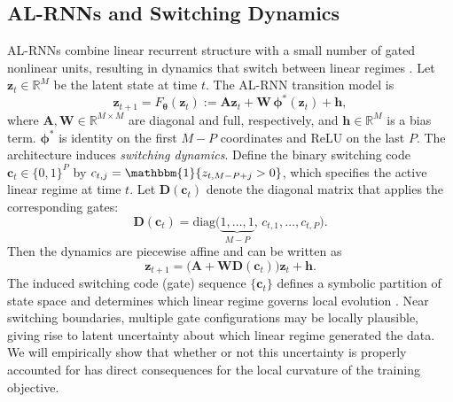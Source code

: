 \documentclass[twoside]{article}
\theoremstyle{plain}
\theoremstyle{definition}
\theoremstyle{remark}
\newcommand{\R}{\mathbb{R}}
\newcommand{\diag}{\mathrm{diag}}
\begin{document}
\subsection{AL-RNNs and Switching Dynamics}
AL-RNNs combine linear recurrent structure with a small number of gated nonlinear units, resulting in dynamics that switch between linear regimes \citep{brenner2024alrnn}. Let $\bm{z}_t\in\R^{M}$ be the latent state at time $t$. The AL-RNN transition model is
\begin{equation}
\label{eq:alrnn}
\bm{z}_{t+1}
= F_{\bm\theta}(\bm{z}_t)
:= \bm{A} \bm{z}_t + \bm{W}\,\bm\phi^\ast(\bm{z}_t) + \bm{h},
\end{equation}
where $\bm{A}, \bm{W} \in \mathbb{R}^{M \times M}$ are diagonal and full, respectively, and $\bm{h} \in \mathbb{R}^M$ is a bias term. $\bm\phi^\ast$ is identity on the first $M-P$ coordinates and ReLU on the last $P$. The architecture induces \emph{switching dynamics}. Define the binary switching code $\bm c_t\in\{0,1\}^P$ by $c_{t,j}=\mathbbm{1}\{z_{t,M-P+j}>0\}$, which specifies the active linear regime at time $t$. Let $\bm{D}(\bm{c}_t)$ denote the diagonal matrix that applies the corresponding gates:
\begin{equation}
\label{eq:Dc}
\bm{D}(\bm{c}_t)
=\diag\big( \underbrace{1,\dots,1}_{M-P},\,c_{t,1},\dots,c_{t,P} \big).
\end{equation}
Then the dynamics are piecewise affine and can be written as
\begin{equation}
\label{eq:pwa}
\bm{z}_{t+1}=\big(\bm{A}+\bm{W}\bm{D}(\bm{c}_t)\big)\bm{z}_t+\bm{h}.
\end{equation}
The induced switching code (gate) sequence $\{\bm {c}_t\}$ defines a symbolic partition of state space and determines which linear regime governs local evolution \citep{brenner2024alrnn}. Near switching boundaries, multiple gate configurations may be locally plausible, giving rise to latent uncertainty about which linear regime generated the data. We will empirically show that whether or not this uncertainty is properly accounted for has direct consequences for the local curvature of the training objective.
\end{document}
